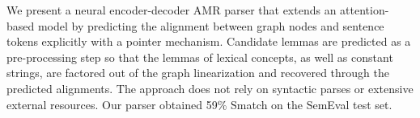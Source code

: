 We present a neural encoder-decoder AMR parser that extends an attention-based model by predicting the alignment between graph nodes and sentence tokens explicitly with a pointer mechanism. Candidate lemmas are predicted as a pre-processing step so that the lemmas of lexical concepts, as well as constant strings, are factored out of the graph linearization and recovered through the predicted alignments. The approach does not rely on syntactic parses or extensive external resources. Our parser obtained 59\% Smatch on the SemEval test set.
